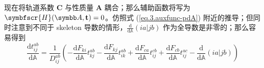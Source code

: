 现在将轨道系数 $\mathbf{C}$ 与性质量 $\mathbf{A}$ 耦合；那么辅助函数将写为 $\symbfscr{H} (\mathbb{A}, \mathbf{t}) = 0$。仿照式 (\ref{eq.3.auxfunc-pdA}) 附近的推导；但同时注意到不同于 skeleton 导数的情形，$\frac{\mathrm{d}}{\mathrm{d} \mathbb{A}} (ia|jb)$ 作为全导数是非零的；那么容易得到
\begin{equation}
    \label{eq.3.pdA-tijab}
    \frac{\mathrm{d} t_{ij}^{ab}}{\mathrm{d} \mathbb{A}} = \frac{1}{D_{ij}^{ab}} \left(
    - \frac{\mathrm{d} F_{ki}}{\mathrm{d} \mathbb{A}} t_{kj}^{ab}
    - \frac{\mathrm{d} F_{kj}}{\mathrm{d} \mathbb{A}} t_{ik}^{ab}
    + \frac{\mathrm{d} F_{ca}}{\mathrm{d} \mathbb{A}} t_{ij}^{cb}
    + \frac{\mathrm{d} F_{cb}}{\mathrm{d} \mathbb{A}} t_{ij}^{ac}
    - \frac{\mathrm{d}}{\mathrm{d} \mathbb{A}} (ia|jb)
    \right)
\end{equation}

